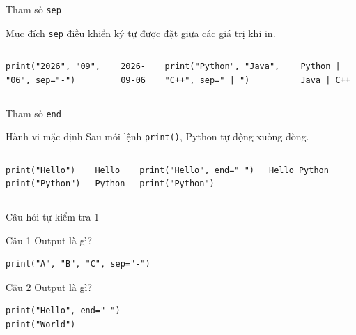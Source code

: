 \documentclass[aspectratio=169,10pt]{beamer}
\begin{document}
\begin{frame}[fragile]{Tham số \texttt{sep}}
\begin{block}{Mục đích}
\texttt{sep} điều khiển ký tự được đặt giữa các giá trị khi in.
\end{block}
\begin{columns}[T,onlytextwidth]
\begin{lstlisting}
print("2026", "09", "06", sep="-")
\end{lstlisting}
\begin{verbatim}
2026-09-06
\end{verbatim}
\begin{lstlisting}
print("Python", "Java", "C++", sep=" | ")
\end{lstlisting}
\begin{verbatim}
Python | Java | C++
\end{verbatim}
\end{columns}
\end{frame}

\begin{frame}[fragile]{Tham số \texttt{end}}
\begin{block}{Hành vi mặc định}
Sau mỗi lệnh \texttt{print()}, Python tự động xuống dòng.
\end{block}
\begin{columns}[T,onlytextwidth]
\begin{lstlisting}
print("Hello")
print("Python")
\end{lstlisting}
\begin{verbatim}
Hello
Python
\end{verbatim}
\begin{lstlisting}
print("Hello", end=" ")
print("Python")
\end{lstlisting}
\begin{verbatim}
Hello Python
\end{verbatim}
\end{columns}
\end{frame}

\begin{frame}[fragile]{Câu hỏi tự kiểm tra 1}
\begin{block}{Câu 1}
Output là gì?
\begin{lstlisting}
print("A", "B", "C", sep="-")
\end{lstlisting}
\end{block}
\begin{block}{Câu 2}
Output là gì?
\begin{lstlisting}
print("Hello", end=" ")
print("World")
\end{lstlisting}
\end{block}
\end{frame}
\end{document}
